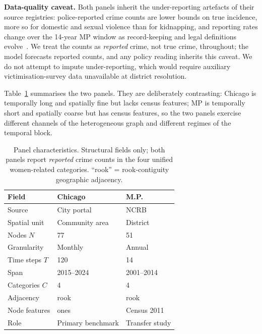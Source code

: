 \documentclass[11pt,conference]{IEEEtran}
\begin{document}
\textbf{Data-quality caveat.} Both panels inherit the under-reporting
artefacts of their source registries: police-reported crime counts are lower
bounds on true incidence, more so for domestic and sexual violence than for
kidnapping, and reporting rates change over the 14-year MP window as
record-keeping and legal definitions evolve~\cite{ncrb_cii}. We treat the
counts as \emph{reported} crime, not true crime, throughout; the model forecasts
reported counts, and any policy reading inherits this caveat. We do not attempt
to impute under-reporting, which would require auxiliary victimisation-survey
data unavailable at district resolution.

Table~\ref{tab:panels} summarises the two panels. They are deliberately
contrasting: Chicago is temporally long and spatially fine but lacks census
features; MP is temporally short and spatially coarse but has census features,
so the two panels exercise different channels of the heterogeneous graph and
different regimes of the temporal block.

\begin{table}[t]
\centering
\caption{Panel characteristics. Structural fields only; both panels report
\emph{reported} crime counts in the four unified women-related categories.
``rook'' = rook-contiguity geographic adjacency.}
\label{tab:panels}
\footnotesize
\setlength{\tabcolsep}{4pt}
\begin{tabular}{lll}
\toprule
Field & Chicago & M.P.\\
\midrule
Source & City portal~\cite{chicagoportal} & NCRB~\cite{ncrb_cii}\\
Spatial unit & Community area & District\\
Nodes $N$ & 77 & 51\\
Granularity & Monthly & Annual\\
Time steps $T$ & 120 & 14\\
Span & 2015--2024 & 2001--2014\\
Categories $C$ & 4 & 4\\
Adjacency & rook & rook\\
Node features & ones & Census 2011~\cite{census2011}\\
Role & Primary benchmark & Transfer study\\
\bottomrule
\end{tabular}
\end{table}

\end{document}
